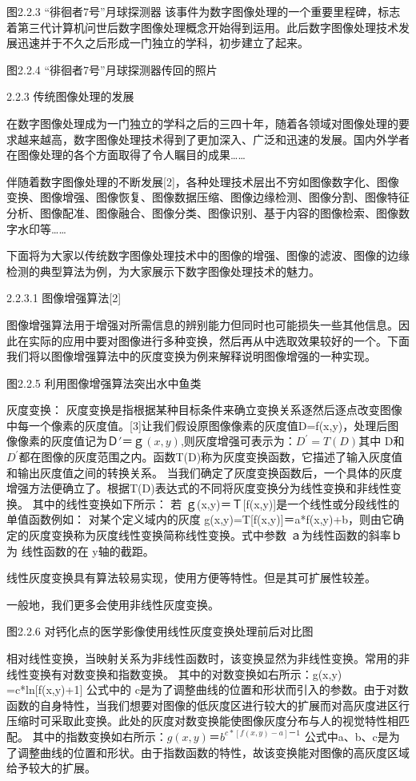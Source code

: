 图2.2.3 “徘徊者7号”月球探测器
该事件为数字图像处理的一个重要里程碑，标志着第三代计算机问世后数字图像处理概念开始得到运用。此后数字图像处理技术发展迅速并于不久之后形成一门独立的学科，初步建立了起来。

图2.2.4 “徘徊者7号”月球探测器传回的照片

2.2.3 传统图像处理的发展

	在数字图像处理成为一门独立的学科之后的三四十年，随着各领域对图像处理的要求越来越高，数字图像处理技术得到了更加深入、广泛和迅速的发展。国内外学者在图像处理的各个方面取得了令人瞩目的成果……

	伴随着数字图像处理的不断发展[2]，各种处理技术层出不穷如图像数字化、图像变换、图像增强、图像恢复、图像数据压缩、图像边缘检测、图像分割、图像特征分析、图像配准、图像融合、图像分类、图像识别、基于内容的图像检索、图像数字水印等……

	下面将为大家以传统数字图像处理技术中的图像的增强、图像的滤波、图像的边缘检测的典型算法为例，为大家展示下数字图像处理技术的魅力。
	
2.2.3.1 图像增强算法[2]

图像增强算法用于增强对所需信息的辨别能力但同时也可能损失一些其他信息。因此在实际的应用中要对图像进行多种变换，然后再从中选取效果较好的一个。下面我们将以图像增强算法中的灰度变换为例来解释说明图像增强的一种实现。

图2.2.5 利用图像增强算法突出水中鱼类

灰度变换：
	灰度变换是指根据某种目标条件来确立变换关系逐然后逐点改变图像中每一个像素的灰度值。[3]让我们假设原图像像素的灰度值D=f(x,y)，处理后图像像素的灰度值记为$Ｄ\prime＝ｇ(x,y)$,则灰度增强可表示为：$D^\prime=T(D)$其中 D和 $D^\prime$都在图像的灰度范围之内。函数T(D)称为灰度变换函数，它描述了输入灰度值和输出灰度值之间的转换关系。 当我们确定了灰度变换函数后，一个具体的灰度增强方法便确立了。根据T(D)表达式的不同将灰度变换分为线性变换和非线性变换。
	其中的线性变换如下所示：
	若 ｇ(x,y)＝Ｔ[f(x,y)]是一个线性或分段线性的单值函数例如：
	对某个定义域内的灰度 g(x,y)=T[f(x,y)]＝a*f(x,y)+b，则由它确定的灰度变换称为灰度线性变换简称线性变换。式中参数 ａ为线性函数的斜率ｂ为 线性函数的在 y轴的截距。
	
线性灰度变换具有算法较易实现，使用方便等特性。但是其可扩展性较差。

一般地，我们更多会使用非线性灰度变换。


图2.2.6 对钙化点的医学影像使用线性灰度变换处理前后对比图

相对线性变换，当映射关系为非线性函数时，该变换显然为非线性变换。常用的非线性变换有对数变换和指数变换。
其中的对数变换如右所示：g(x,y) =c*ln[f(x,y)+1] 
公式中的 c是为了调整曲线的位置和形状而引入的参数。由于对数函数的自身特性，当我们想要对图像的低灰度区进行较大的扩展而对高灰度进区行压缩时可采取此变换。此处的灰度对数变换能使图像灰度分布与人的视觉特性相匹配。
其中的指数变换如右所示：$g(x,y) ＝b^ {c*[f(x,y)-a] －1}$
公式中a、b、c是为了调整曲线的位置和形状。由于指数函数的特性，故该变换能对图像的高灰度区域给予较大的扩展。

